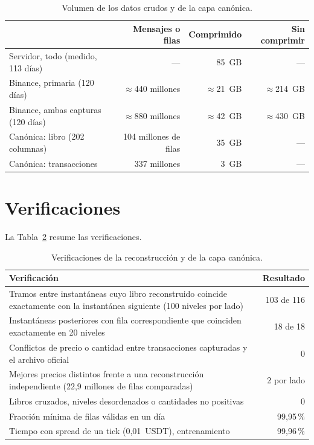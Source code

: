 \begin{table}[htbp]
\centering\small\setlength{\tabcolsep}{4pt}
\caption[Volumen de datos crudos y canónicos.]{Volumen de los datos crudos y de la capa canónica.}
\label{tab:volumen}
\begin{tabular}{@{}lrrr@{}}
\toprule
 & Mensajes o filas & Comprimido & Sin comprimir\\\midrule
Servidor, todo (medido, 113 días) & --- & 85~GB & ---\\
Binance, primaria (120 días) & $\approx$440 millones & $\approx$21~GB & $\approx$214~GB\\
Binance, ambas capturas (120 días) & $\approx$880 millones & $\approx$42~GB & $\approx$430~GB\\
Canónica: libro (202 columnas) & 104 millones de filas & 35~GB & ---\\
Canónica: transacciones & 337 millones & 3~GB & ---\\
\bottomrule
\end{tabular}
\end{table}

\section{Verificaciones}
La Tabla~\ref{tab:auditoria} resume las verificaciones.

\begin{table}[htbp]
\centering\small
\caption[Verificaciones de los datos.]{Verificaciones de la reconstrucción y de la capa canónica.}
\label{tab:auditoria}
\begin{tabular}{@{}p{}r@{}}
\toprule Verificación & Resultado\\\midrule
Tramos entre instantáneas cuyo libro reconstruido coincide exactamente con la instantánea siguiente (100 niveles por lado) & 103 de 116\\
Instantáneas posteriores con fila correspondiente que coinciden exactamente en 20 niveles & 18 de 18\\
Conflictos de precio o cantidad entre transacciones capturadas y el archivo oficial & 0\\
Mejores precios distintos frente a una reconstrucción independiente (22,9 millones de filas comparadas) & 2 por lado\\
Libros cruzados, niveles desordenados o cantidades no positivas & 0\\
Fracción mínima de filas válidas en un día & 99,95\,\%\\
Tiempo con spread de un tick (0,01~USDT), entrenamiento & 99,96\,\%\\
\bottomrule
\end{tabular}
\end{table}

